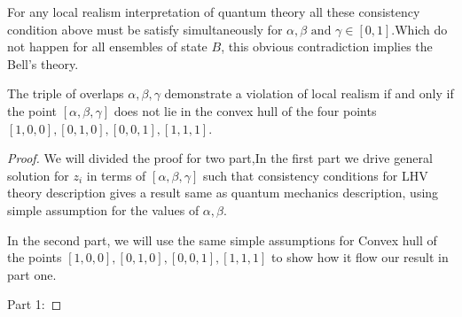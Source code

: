 For any local realism interpretation of quantum theory all these consistency condition above must be satisfy simultaneously for $\alpha, \beta \text{ and } \gamma \in [0,1]$.Which do not happen for all ensembles of state $B$, this obvious contradiction implies the Bell's theory.

\begin{theorem}
The triple of overlaps $\alpha,\beta, \gamma$ demonstrate a violation of local realism if and only if the point $[\alpha,\beta, \gamma]$ does not lie in the convex hull of the four points
$[1, 0, 0], [0, 1, 0], [0, 0, 1], [1, 1, 1]$.
\end{theorem}

\begin{proof}\hfill \break
We will divided the proof for two part,In the first part we drive general solution for $z_i$ in terms of $[\alpha, \beta, \gamma]$ such that consistency conditions for LHV theory description gives a result same as quantum mechanics description, using simple assumption for the values of $\alpha,\beta $.


In the second part, we will use the same simple assumptions for Convex hull of the points $[1, 0, 0], [0, 1, 0], [0, 0, 1], [1, 1, 1]$  to show how it flow our result in part one.

Part 1:


\end{proof}
